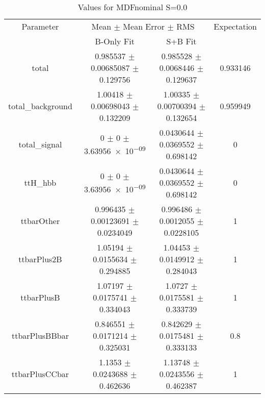 \begin{table}
\centering
\caption{Values for MDFnominal S=0.0}
\begin{tabular}{cccc}
\toprule
Parameter & \multicolumn{2}{c}{Mean $\pm$ Mean Error $\pm$ RMS} & Expectation\\
 & B-Only Fit & S+B Fit & \\
\midrule
total & \num{0.985537} $\pm$ \num{0.00685087} $\pm$ \num{0.129756} & \num{0.985528} $\pm$ \num{0.0068446} $\pm$ \num{0.129637} & \num{0.933146}\\
total\_background & \num{1.00418} $\pm$ \num{0.00698043} $\pm$ \num{0.132209} & \num{1.00335} $\pm$ \num{0.00700394} $\pm$ \num{0.132654} & \num{0.959949}\\
total\_signal & \num{0} $\pm$ \num{0} $\pm$ \num{3.63956e-09} & \num{0.0430644} $\pm$ \num{0.0369552} $\pm$ \num{0.698142} & \num{0}\\
ttH\_hbb & \num{0} $\pm$ \num{0} $\pm$ \num{3.63956e-09} & \num{0.0430644} $\pm$ \num{0.0369552} $\pm$ \num{0.698142} & \num{0}\\
ttbarOther & \num{0.996435} $\pm$ \num{0.00123691} $\pm$ \num{0.0234049} & \num{0.996486} $\pm$ \num{0.0012055} $\pm$ \num{0.0228105} & \num{1}\\
ttbarPlus2B & \num{1.05194} $\pm$ \num{0.0155634} $\pm$ \num{0.294885} & \num{1.04453} $\pm$ \num{0.0149912} $\pm$ \num{0.284043} & \num{1}\\
ttbarPlusB & \num{1.07197} $\pm$ \num{0.0175741} $\pm$ \num{0.334043} & \num{1.0727} $\pm$ \num{0.0175581} $\pm$ \num{0.333739} & \num{1}\\
ttbarPlusBBbar & \num{0.846551} $\pm$ \num{0.0171214} $\pm$ \num{0.325031} & \num{0.842629} $\pm$ \num{0.0175481} $\pm$ \num{0.333133} & \num{0.8}\\
ttbarPlusCCbar & \num{1.1353} $\pm$ \num{0.0243688} $\pm$ \num{0.462636} & \num{1.13748} $\pm$ \num{0.0243556} $\pm$ \num{0.462387} & \num{1}\\
\bottomrule
\end{tabular}
\end{table}
